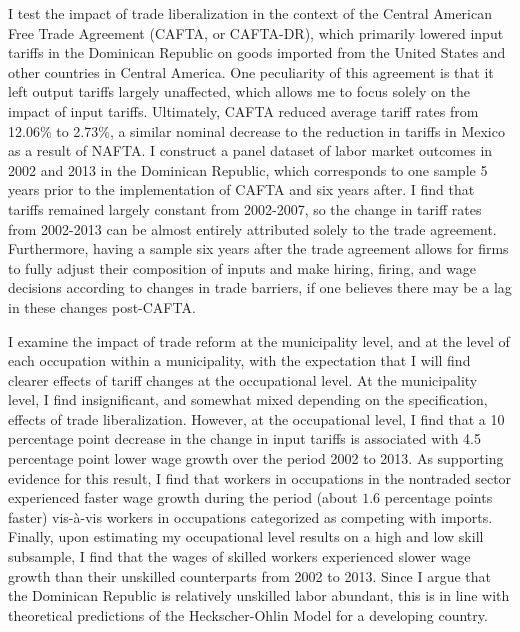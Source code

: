 I test the impact of trade liberalization in the context of the Central American Free Trade Agreement
(CAFTA, or CAFTA-DR), which primarily lowered input tariffs in the Dominican Republic on goods imported from
the United States and other countries in Central America. One peculiarity of this agreement is
that it left output tariffs largely unaffected, which allows me to focus solely on the impact 
of input tariffs. Ultimately, CAFTA reduced average tariff rates from 12.06\% to 2.73\%, a similar 
nominal decrease to the reduction in tariffs in Mexico as a result of NAFTA. I construct a panel
dataset of labor market outcomes in 2002 and 2013 in the Dominican Republic, which corresponds to
one sample 5 years prior to the implementation of CAFTA and six years after. I find that tariffs
remained largely constant from 2002-2007, so the change in tariff rates from 2002-2013 can be
almost entirely attributed solely to the trade agreement. Furthermore, having a sample six years
after the trade agreement allows for firms to fully adjust their composition of inputs and make hiring, firing,
and wage decisions according to changes in trade barriers, if one believes there may be a lag 
in these changes post-CAFTA.

I examine the impact of trade reform at the municipality level, and at the level of each occupation
within a municipality, with the expectation that I will find clearer effects of tariff changes at
the occupational level. At the municipality level, I find insignificant, and somewhat mixed depending
on the specification, effects of trade liberalization. However, at the occupational level, 
I find that a 10 percentage point decrease in the change in input tariffs is associated with 4.5 
percentage point lower wage growth over the period 2002 to 2013. As supporting evidence for this result, I find that
workers in occupations in the nontraded sector experienced faster wage growth during the period 
(about $1.6$ percentage points faster) vis-\`{a}-vis workers in occupations categorized as competing with 
imports. Finally, upon estimating my occupational level results on a high and low skill subsample, 
I find  that the wages of skilled workers experienced slower wage growth than their unskilled 
counterparts from 2002 to 2013. Since I argue that the Dominican Republic is relatively unskilled labor
abundant, this is in line with theoretical predictions of the Heckscher-Ohlin Model 
for a developing country.

